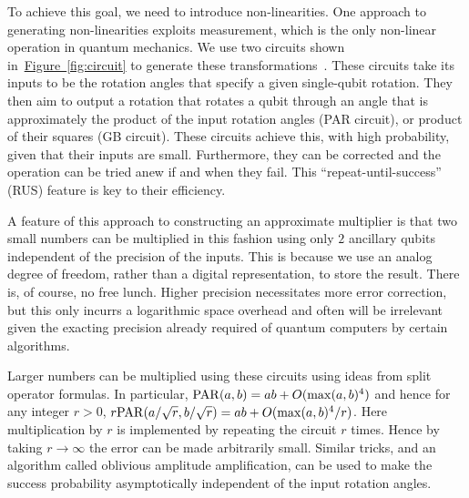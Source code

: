 \documentclass[conference]{IEEEtran}
\newcommand{\eq}[1]{Eq.~\hyperref[eq:#1]{(\ref*{eq:#1})}}
\newcommand{\fig}[1]{\hyperref[fig:#1]{Figure~\ref*{fig:#1}}}
\newcommand{\nix}[1]{{}}
\begin{document}
\nix{
Our solution to this problem is inspired in part from the Fourier adder.  The Fourier adder takes advantage of the fact that, for any $(a,b) \in \mathbb{R}^2$
\begin{equation}
e^{ia Z} e^{ib Z} =e^{i(a+b)Z}.\label{eq:phaseadd}
\end{equation}
This shows that if $f(x)$ is a sum then we can use this structure to implement~\eq{target} without requiring any additional ancillae.  However, in order to do this for more general functions we need to have the ability to perform a non-linear operation, such as multiplication.  Since quantum mechanics is a linear theory such non-linear operations a challenge to devise.
}
To achieve this goal, we need to introduce non-linearities.
One approach to generating non-linearities exploits measurement, which is the only non-linear operation in quantum mechanics.  We use two circuits shown in~\fig{circuit} to generate these transformations~\cite{WR16}.  These circuits take its inputs to be the rotation angles that specify a given single-qubit rotation.  They then aim to output a rotation that rotates a qubit through an angle that is approximately the product of the input rotation angles (PAR circuit), or product of their squares (GB circuit).  These circuits achieve this, with high probability, given that their inputs are small.  Furthermore, they can be corrected and the operation can be tried anew if and when they fail.  This ``repeat-until-success'' (RUS) feature is key to their efficiency.

A feature of this approach to constructing an approximate multiplier is that two small numbers can be multiplied in this fashion using only $2$ ancillary qubits independent of the precision of the inputs.  This is because we use an analog degree of freedom, rather than a digital representation, to store the result.  There is, of course, no free lunch.  Higher precision necessitates more error correction, but this only incurrs a logarithmic space overhead and often will be irrelevant given the exacting precision already required of quantum computers by certain algorithms.

Larger numbers can be multiplied using these circuits using ideas from split operator formulas.  In particular, ${\rm PAR}( a,b) = ab + O(\max(a,b)^4)$ and hence for any integer $r>0$,
$r{\rm PAR}(a/\sqrt{r},b/\sqrt{r})=ab + O(\max(a,b)^4/r)$.  Here multiplication by $r$ is implemented by repeating the circuit $r$ times.  Hence by taking $r\rightarrow \infty$ the error can be made arbitrarily small.  Similar tricks, and an algorithm called oblivious amplitude amplification, can be used to make the success probability asymptotically independent of the input rotation angles.
\end{document}
